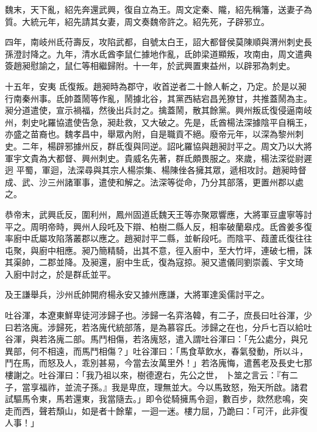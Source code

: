 \begin{pinyinscope}
 魏末，天下亂，紹先奔還武興，復自立為王。周文定秦、隴，紹先稱籓，送妻子為質。大統元年，紹先請其女妻，周文奏魏帝許之。紹先死，子辟邪立。



 四年，南岐州氐苻壽反，攻陷武都，自號太白王，詔大都督侯莫陳順與渭州刺史長孫澄討降之。九年，清水氐酋李鼠仁據地作亂，氐帥梁道顯叛，攻南由，周文遣典簽趙昶慰諭之，鼠仁等相繼歸附。十一年，於武興置東益州，以辟邪為刺史。



 十五年，安夷
 氐復叛。趙昶時為郡守，收首逆者二十餘人斬之，乃定。於是以昶行南秦州事。氐帥蓋鬧等作亂，鬧據北谷，其黨西結宕昌羌獠甘，共推蓋鬧為主。昶分道遣使，宣示禍福，然後出兵討之。擒蓋鬧，散其餘黨。興州叛氐復侵逼南岐州，刺史叱羅協遣使告急，昶赴救，又大破之。先是，氐酋楊法深據陰平自稱王，亦盛之苗裔也。魏孝昌中，舉眾內附，自是職貢不絕。廢帝元年，以深為黎州刺史。二年，楊辟邪據州反，群氐復與同逆。詔叱羅協與趙昶討平之。周文乃以大將軍宇文貴為大都督、興州刺史。貴威名先著，群氐頗畏服之。來歲，楊法深從尉遲迥
 平蜀，軍迴，法深尋與其宗人楊崇集、楊陳侳各擁其眾，遞相攻討。趙昶時督成、武、沙三州諸軍事，遣使和解之。法深等從命，乃分其部落，更置州郡以處之。



 恭帝末，武興氐反，圍利州，鳳州固道氐魏天王等亦聚眾響應，大將軍豆盧寧等討平之。周明帝時，興州人段吒及下辯、柏樹二縣人反，相率破蘭皋戍。氐酋姜多復率廚中氐屬攻陷落叢郡以應之。趙昶討平二縣，並斬段吒。而陰平、葭蘆氐復往往屯聚，與廚中相應。昶乃簡精騎，出其不意，徑入廚中，至大竹坪，連破七柵，誅其渠帥，二郡並降。及昶還，廚中生氐，復為寇掠。昶又遣儀同劉崇義、宇文琦
 入廚中討之，於是群氐並平。



 及王謙舉兵，沙州氐帥開府楊永安又據州應謙，大將軍達奚儒討平之。



 吐谷渾，本遼東鮮卑徒河涉歸子也。涉歸一名弈洛韓，有二子，庶長曰吐谷渾，少曰若洛廆。涉歸死，若洛廆代統部落，是為慕容氏。涉歸之在也，分戶七百以給吐谷渾，與若洛廆二部。馬鬥相傷，若洛廆怒，遣入謂吐谷渾曰：「先公處分，與兄異部，何不相遠，而馬鬥相傷？」吐谷渾曰：「馬食草飲水，春氣發動，所以斗，鬥在馬，而怒及人，乖別甚易，今當去汝萬里外！」若洛廆悔，遣舊老及長史七那樓謝之。吐谷渾曰：「我乃祖以來，樹德遼右，先公之世，
 卜筮之言云：『有二子，當享福祚，並流子孫。』我是卑庶，理無並大。今以馬致怒，殆天所啟。諸君試驅馬令東，馬若還東，我當隨去。」即令從騎擁馬令迴，數百步，欻然悲鳴，突走而西，聲若頹山，如是者十餘輩，一迴一迷。樓力屈，乃跪曰：「可汗，此非復人事！」




\end{pinyinscope}
